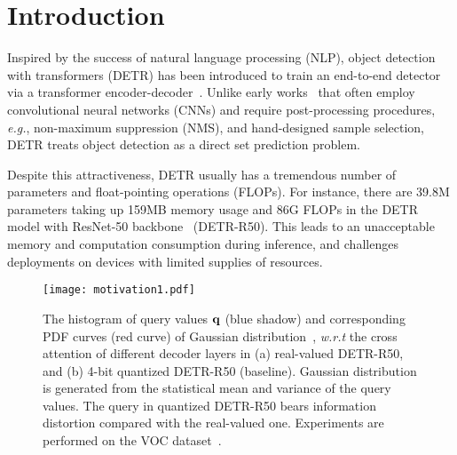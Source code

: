 \documentclass[10pt,twocolumn,letterpaper]{article}
\begin{document}
\section{Introduction}
\label{sec:intro}

Inspired by the success of natural language processing (NLP), object detection with transformers (DETR) has been introduced to train an end-to-end detector via a transformer encoder-decoder~\cite{carion2020end}. Unlike early works~\cite{ren2016faster,liu2016ssd} that often employ convolutional neural networks (CNNs) and require post-processing procedures, {\em e.g.}, non-maximum suppression (NMS), and hand-designed sample selection, DETR treats object detection as a direct set prediction problem.%
%
%

Despite this attractiveness, DETR usually has a tremendous number of parameters and float-pointing operations (FLOPs). 
For instance, there are 39.8M parameters taking up 159MB memory usage and 86G FLOPs in the DETR model with ResNet-50 backbone~\cite{he2016deep} (DETR-R50). 
This leads to an unacceptable memory and computation consumption during inference, and challenges deployments on devices with limited supplies of resources.


\begin{figure}
    \centering
    \texttt{[image: motivation1.pdf]} %
    \caption{The histogram of query values ${\bf q}$ (blue shadow) and corresponding PDF curves (red curve) of Gaussian distribution~\cite{li2022q}, {\em w.r.t} the cross attention of different decoder layers in (a) real-valued DETR-R50, and (b) 4-bit quantized DETR-R50 (baseline). 
    Gaussian distribution is generated from the statistical mean and variance of the query values.
    The query in quantized DETR-R50 bears information distortion compared with the real-valued one. Experiments are performed on the VOC dataset~\cite{voc2007}.
    }
    \label{fig:motivation1}
\end{figure}
\end{document}
